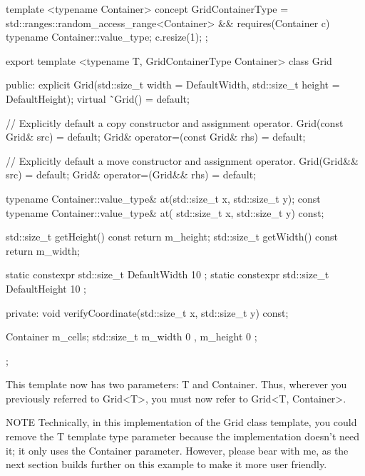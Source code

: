 \begin{cpp}
template <typename Container>
concept GridContainerType =
    std::ranges::random_access_range<Container> &&
    requires(Container c) {
        typename Container::value_type;
        c.resize(1);
    };

export template <typename T, GridContainerType Container>
class Grid
{
    public:
        explicit Grid(std::size_t width = DefaultWidth,
            std::size_t height = DefaultHeight);
        virtual ˜Grid() = default;

        // Explicitly default a copy constructor and assignment operator.
        Grid(const Grid& src) = default;
        Grid& operator=(const Grid& rhs) = default;

        // Explicitly default a move constructor and assignment operator.
        Grid(Grid&& src) = default;
        Grid& operator=(Grid&& rhs) = default;

        typename Container::value_type& at(std::size_t x, std::size_t y);
        const typename Container::value_type& at(
            std::size_t x, std::size_t y) const;

        std::size_t getHeight() const { return m_height; }
        std::size_t getWidth() const { return m_width; }

        static constexpr std::size_t DefaultWidth { 10 };
        static constexpr std::size_t DefaultHeight { 10 };

    private:
        void verifyCoordinate(std::size_t x, std::size_t y) const;

        Container m_cells;
        std::size_t m_width { 0 }, m_height { 0 };
};
\end{cpp}

This template now has two parameters: T and Container. Thus, wherever you previously referred to Grid<T>, you must now refer to Grid<T, Container>.

\begin{myNotic}{NOTE}
Technically, in this implementation of the Grid class template, you could remove the T template type parameter because the implementation doesn’t need it; it only uses the Container parameter. However, please bear with me, as the next section builds further on this example to make it more user friendly.
\end{myNotic}

